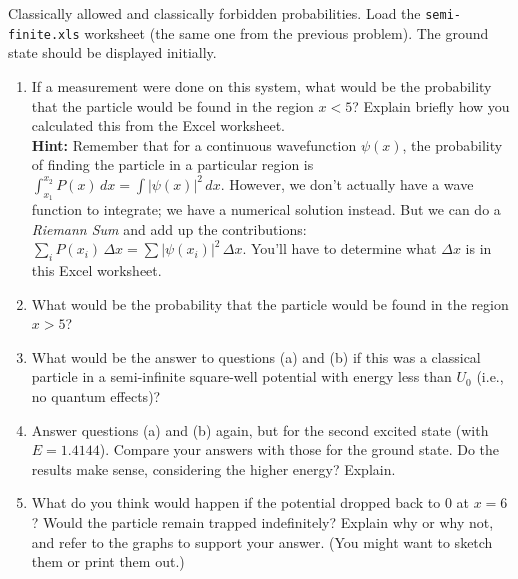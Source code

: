 \begin{aproblem}{Classically allowed and classically forbid\-den
probabilities.}  
  Load the \verb+semi-finite.xls+ worksheet (the same one from the
  previous problem).  The ground state should be displayed initially.
  \begin{enumerate}
  \item If a measurement were done on this system, what would be the
    probability that the particle would be found in the region $x <
    5$?  Explain briefly how you calculated this from the Excel
    worksheet. \\ {\bf Hint:} Remember that for a continuous
    wavefunction $\psi(x)$, the probability of finding the particle in
    a particular region is\\ $\int_{x_1}^{x_2} P(x)\, dx = \int |\psi
    (x)|^2\, dx$.  However, we don't actually have a wave function to
    integrate; we have a numerical solution instead.  But we can do a
    {\it Riemann Sum} and add up the contributions: $\sum_i P(x_i)\,
    \Delta x = \sum |\psi(x_i)|^2\, \Delta x$. You'll have to
    determine what $\Delta x$ is in this Excel worksheet.
  \item What would be the probability that the particle would be found
    in the region $x > 5$?
  \item What would be the answer to questions (a) and (b) if this was
    a classical particle in a semi-infinite square-well potential with
    energy less than $U_0$ (i.e., no quantum effects)?
  \item Answer questions (a) and (b) again, but for the second excited
    state (with $E = 1.4144$).  Compare your answers with those for
    the ground state.  Do the results make sense, considering the
    higher energy? Explain.
  \item What do you think would happen if the potential dropped back
    to 0 at $x=6$?  Would the particle remain trapped indefinitely?
    Explain why or why not, and refer to the graphs to support your
    answer.  (You might want to sketch them or print them out.)
  \end{enumerate}
\end{aproblem}

\newpage

